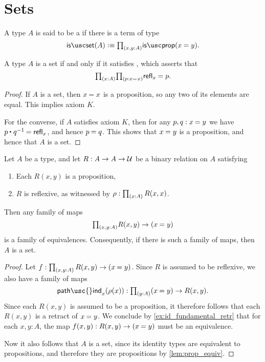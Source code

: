 \section{Sets}

\begin{defn}
A type $A$ is said to be a  if there is a term of type
\begin{equation*}
\isset(A)\defeq \prd{x,y:A}\isprop(\id{x}{y}).
\end{equation*}
\end{defn}

\begin{lem}
A type $A$ is a set if and only if it satisfies , which asserts that
\begin{equation*}
\prd{x:A}{p:\id{x}{x}}\id{\refl{x}}{p}.
\end{equation*}
\end{lem}

\begin{proof}
If $A$ is a set, then $\id{x}{x}$ is a proposition, so any two of its elements are equal. 
This implies axiom $K$. 

For the converse, if $A$ satisfies axiom $K$, then for any $p,q:\id{x}{y}$ we have $\id{\ct{p}{q^{-1}}}{\refl{x}}$, and hence $\id{p}{q}$. This shows that $\id{x}{y}$ is a proposition, and hence that $A$ is a set.
\end{proof}

\begin{lem}\label{lem:prop_to_id}
Let $A$ be a type, and let $R:A\to A\to\mathcal{U}$ be a binary relation on $A$ satisfying
\begin{enumerate}
\item Each $R(x,y)$ is a proposition,
\item $R$ is reflexive, as witnessed by $\rho:\prd{x:A}R(x,x)$.
\end{enumerate}
Then any family of maps
\begin{equation*}
\prd{x,y:A}R(x,y)\to (\id{x}{y})
\end{equation*}
is a family of equivalences. Consequently, if there is such a family of maps, then $A$ is a set.
\end{lem}

\begin{proof}
Let $f:\prd{x,y:A}R(x,y)\to(\id{x}{y})$. 
Since $R$ is assumed to be reflexive, we also have a family of maps
\begin{equation*}
\mathsf{path\usc{}ind}_x(\rho(x)):\prd{y:A}(\id{x}{y})\to R(x,y).
\end{equation*}
Since each $R(x,y)$ is assumed to be a proposition, it therefore follows that each $R(x,y)$ is a retract of $\id{x}{y}$. We conclude by \autoref{ex:id_fundamental_retr} that for each $x,y:A$, the map $f(x,y):R(x,y)\to(\id{x}{y})$ must be an equivalence.

Now it also follows that $A$ is a set, since its identity types are equivalent to propositions, and therefore they are propositions by \cref{lem:prop_equiv}. 
\end{proof}

